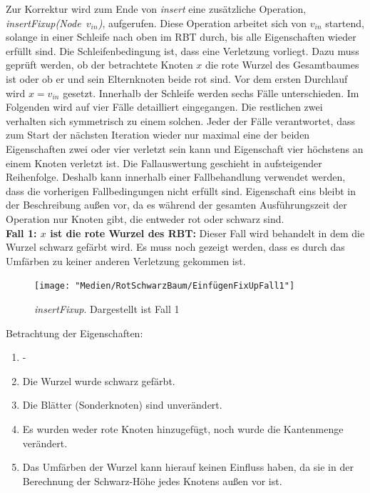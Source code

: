 \documentclass[a4paper,12pt]{article}
\begin{document}
\noindent Zur Korrektur wird zum Ende von \textit{insert} eine zusätzliche Operation,\\  \mbox{\textit{insertFixup(Node $v_{in}$)}}, aufgerufen. Diese Operation arbeitet sich von $v_{in}$ startend, solange in einer Schleife nach oben im RBT durch, bis alle Eigenschaften wieder erfüllt sind. Die Schleifenbedingung ist, dass eine Verletzung vorliegt. Dazu muss geprüft werden, ob der betrachtete Knoten $x$ die rote Wurzel des Gesamtbaumes ist oder ob er und sein Elternknoten beide rot sind. Vor dem ersten Durchlauf wird $x = v_{in}$ gesetzt. Innerhalb der Schleife werden sechs Fälle unterschieden. Im Folgenden wird auf vier Fälle detailliert eingegangen. Die restlichen zwei verhalten sich symmetrisch zu einem solchen. Jeder der Fälle verantwortet, dass zum Start der nächsten Iteration wieder nur maximal eine der beiden Eigenschaften zwei oder vier verletzt sein kann und Eigenschaft vier höchstens an einem Knoten verletzt ist. Die Fallauswertung geschieht in aufsteigender Reihenfolge. Deshalb kann innerhalb einer Fallbehandlung verwendet werden, dass die vorherigen Fallbedingungen nicht erfüllt sind. Eigenschaft eins bleibt in der Beschreibung außen vor, da es während der gesamten Ausführungszeit der Operation nur Knoten gibt, die entweder rot oder schwarz sind. \\

\noindent\textbf{Fall 1: $x$ ist die rote Wurzel des RBT: }
Dieser Fall wird behandelt in dem die Wurzel schwarz gefärbt wird. Es muss noch gezeigt werden, dass es durch das Umfärben zu keiner anderen Verletzung gekommen ist.\\
\begin{figure}[H]
	\centering
	\texttt{[image: "Medien/RotSchwarzBaum/EinfügenFixUpFall1"]}
	\caption{\textit{insertFixup}. Dargestellt ist Fall 1  }
	\label{fig:EinfügenFixUpFall1}
\end{figure}

Betrachtung der Eigenschaften:
\begin{enumerate}
	\item -
	\item Die Wurzel wurde schwarz gefärbt.
	\item Die Blätter (Sonderknoten) sind unverändert.
	\item Es wurden weder rote Knoten hinzugefügt, noch wurde die Kantenmenge verändert. 
	\item Das Umfärben der Wurzel kann hierauf keinen Einfluss haben, da sie in der Berechnung der Schwarz-Höhe jedes Knotens außen vor ist.
\end{enumerate}  
\end{document}
